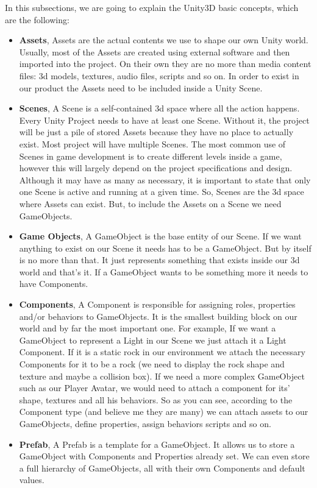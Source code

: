 In this subsections, we are going to explain the Unity3D basic concepts, which are the following:

\begin{itemize}
\item \textbf{Assets}, Assets are the actual contents we use to shape our own Unity world. Usually, most of the Assets are created using external software and then imported into the project.
On their own they are no more than media content files: 3d models, textures, audio files, scripts and so on. 
In order to exist in our product the Assets need to be included inside a Unity Scene.
\item \textbf{Scenes}, A Scene is a self-contained 3d space where all the action happens. Every Unity Project needs to have at least one Scene. Without it, the project will be just a pile of stored Assets because they have no place to actually exist.
Most project will have multiple Scenes. The most common use of Scenes in game development is to create different levels inside a game, however this will largely depend on the project specifications and design. Although it may have as many as necessary, it is important to state that only one Scene is active and running at a given time.
So, Scenes are the 3d space where Assets can exist. But, to include the Assets on a Scene we need GameObjects.
\item \textbf{Game Objects}, A GameObject is the base entity of our Scene. If we want anything to exist on our Scene it needs has to be a GameObject. But by itself is no more than that. It just represents something that exists inside our 3d world and that’s it.
If a GameObject wants to be something more it needs to have Components.
\item \textbf{Components}, A Component is responsible for assigning roles, properties and/or behaviors to GameObjects. It is the smallest building block on our world and by far the most important one.
For example, If we want a GameObject to represent a Light in our Scene we just attach it a Light Component. If it is a static rock in our environment we attach the necessary Components for it to be a rock (we need to display the rock shape and texture and maybe a collision box). If we need a more complex GameObject such as our Player Avatar, we would need to attach a component for its’ shape, textures and all his behaviors.
So as you can see, according to the Component type (and believe me they are many) we can attach assets to our GameObjects, define properties, assign behaviors scripts and so on.
\item \textbf{Prefab}, A Prefab is a template for a GameObject. It allows us to store a GameObject with Components and Properties already set. We can even store a full hierarchy of GameObjects, all with their own Components and default values. 
\end{itemize}

